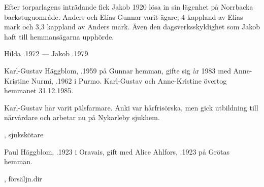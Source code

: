 Efter torparlagens inträdande fick Jakob 1920 lösa in sin lägenhet på Norrbacka backstuguområde. Anders och Elias Gunnar varit ägare; 4 kappland av Elias mark och 3,3 kappland av Anders mark. Även den dagsverksskyldighet som Jakob haft till hemmansägarna upphörde.

Hilda .1972  ---  Jakob .1979



%



%
Karl-Gustav Häggblom, .1959 på Gunnar hemman, gifte sig år 1983 med Anne-Kristine Nurmi, .1962 i Purmo. Karl-Gustav och Anne-Kristine övertog hemmanet 31.12.1985.

Karl-Gustav har varit pälsfarmare. Anki var hårfrisörska, men gick utbildning till närvårdare och arbetar nu på Nykarleby sjukhem.
\begin{jhchildren}
  \item {}
  \item {}, sjukskötare
\end{jhchildren}


%
Paul Häggblom, .1923 i Oravais, gift med Alice Ahlfors, .1923 på Grötas hemman.
\begin{jhchildren}
  \item {}
  \item {}, försäljn.dir
  \item {}
  \item {}
  \item {}
\end{jhchildren}

